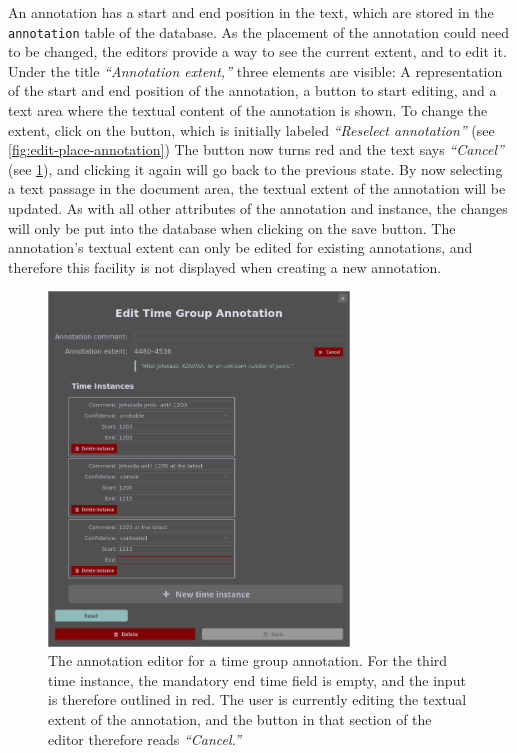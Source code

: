 An annotation has a start and end position in the text, which are stored in the \verb!annotation! table of the database.
As the placement of the annotation could need to be changed, the editors provide a way to see the current extent, and to edit it.
Under the title \emph{\enquote{Annotation extent,}} three elements are visible:
A representation of the start and end position of the annotation, a button to start editing, and a text area where the textual content of the annotation is shown.
To change the extent, click on the button, which is initially labeled \emph{\enquote{Reselect annotation}} (see \cref{fig:edit-place-annotation})
The button now turns red and the text says \emph{\enquote{Cancel}} (see \cref{fig:edit-timegroup-annotation}), and clicking it again will go back to the previous state.
By now selecting a text passage in the document area, the textual extent of the annotation will be updated.
As with all other attributes of the annotation and instance, the changes will only be put into the database when clicking on the save button.
The annotation's textual extent can only be edited for existing annotations, and therefore this facility is not displayed when creating a new annotation.

\begin{figure}[htb]
  \centering
  \includegraphics[width=8cm]{../src/assets/annotator-documentation/edit-timegroup-annotation.png}
  \caption{
    The annotation editor for a time group annotation.
    For the third time instance, the mandatory end time field is empty, and the input is therefore outlined in red.
    The user is currently editing the textual extent of the annotation, and the button in that section of the editor therefore reads \emph{\enquote{Cancel.}}
  }
  \label{fig:edit-timegroup-annotation}
\end{figure}

